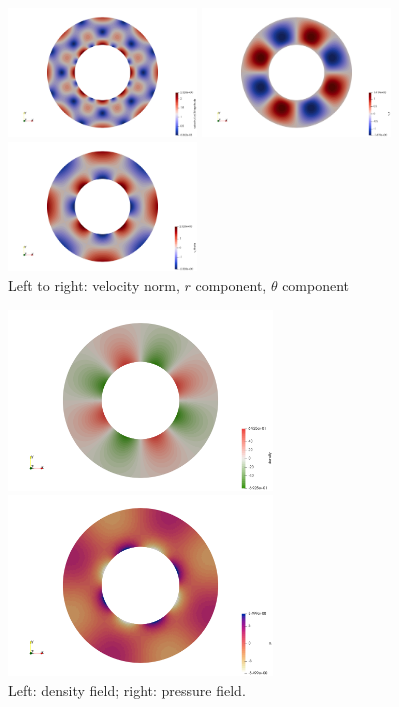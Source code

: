 \begin{center}
\includegraphics[width=5cm]{python_codes/fieldstone_09/velocity}
\includegraphics[width=5cm]{python_codes/fieldstone_09/vr}
\includegraphics[width=5cm]{python_codes/fieldstone_09/vtheta}\\
{\small Left to right: velocity norm, $r$ component, $\theta$ component}
\end{center}

\begin{center}
\includegraphics[width=7cm]{python_codes/fieldstone_09/density}
\includegraphics[width=7cm]{python_codes/fieldstone_09/pressure}\\
{\small Left: density field; right: pressure field.}
\end{center}

